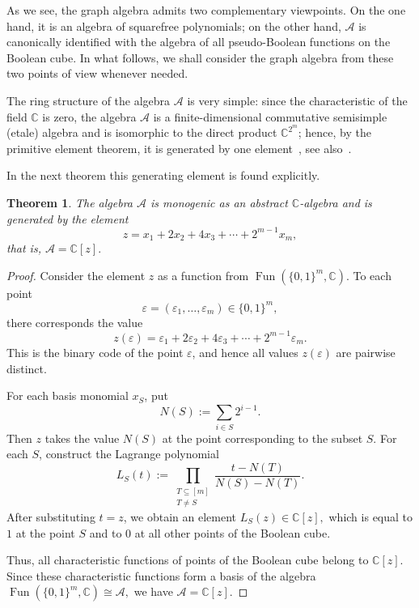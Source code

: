 \documentclass[12pt,reqno]{amsart}
\newtheorem{theorem}{Theorem}[section]
\begin{document}
\medskip
As we see, the graph algebra admits two complementary viewpoints. On the one
hand, it is an algebra of squarefree polynomials; on the other hand,
$\mathcal A$ is canonically identified with the algebra of all pseudo-Boolean
functions on the Boolean cube.
In what follows, we shall consider the graph algebra from these two points of
view whenever needed.

The ring structure of the algebra $\mathcal A$ is very simple: since the
characteristic of the field $\mathbb C$ is zero, the algebra $\mathcal A$ is a
finite-dimensional commutative semisimple (etale) algebra and is isomorphic to
the direct product $\mathbb C^{2^m}$; hence, by the primitive element theorem,
it is generated by one element~\cite[Theorem~2.2]{Dobbs1999}, see
also~\cite[Chapters~II, V]{LangAlgebra}.

In the next theorem this generating element is found explicitly.

\begin{theorem}\label{A_monogenic}
The algebra
$
\mathcal A
$
is monogenic as an abstract $\mathbb C$-algebra and is generated by the element
$$
z=x_1+2x_2+4x_3+\cdots+2^{m-1}x_m,
$$
that is,
$
\mathcal A=\mathbb C[z].
$
\end{theorem}

\begin{proof}
Consider the element $z$ as a function from
$
\operatorname{Fun}(\{0,1\}^m,\mathbb C).
$
To each point
$$
\varepsilon=(\varepsilon_1,\dots,\varepsilon_m)\in\{0,1\}^m,
$$
there corresponds the value
$$
z(\varepsilon)
=
\varepsilon_1+2\varepsilon_2+4\varepsilon_3+\cdots+2^{m-1}\varepsilon_m.
$$
This is the binary code of the point $\varepsilon$, and hence all values
$z(\varepsilon)$ are pairwise distinct.

For each basis monomial $x_S$, put
$$
N(S):=\sum_{i\in S}2^{i-1}.
$$
Then $z$ takes the value $N(S)$ at the point corresponding to the subset $S$.
For each $S$, construct the Lagrange polynomial
$$
L_S(t):=
\prod_{\substack{T\subseteq[m]\\T\neq S}}
\frac{t-N(T)}{N(S)-N(T)}.
$$
After substituting $t=z$, we obtain an element
$
L_S(z)\in \mathbb C[z],
$
which is equal to $1$ at the point $S$ and to $0$ at all other points of the
Boolean cube.

Thus, all characteristic functions of points of the Boolean cube belong to
$\mathbb C[z]$.
Since these characteristic functions form a basis of the algebra
$
\operatorname{Fun}(\{0,1\}^m,\mathbb C)\cong \mathcal A,
$
we have
$
\mathcal A=\mathbb C[z].
$
\end{proof}
\end{document}
